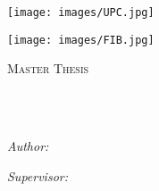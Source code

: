 \documentclass[
11pt, %
english, %
singlespacing, %
headsepline, %
]{MastersDoctoralThesis} %
\author{Pol \textsc{Álvarez Vecino}} %
\begin{document}
\frontmatter %

\pagestyle{plain} %


\begin{titlepage}
\begin{minipage}[c]{0.4\linewidth}
\hspace{0.12\linewidth}%
\texttt{[image: images/UPC.jpg]}
\end{minipage}%
\hspace{0.1\linewidth}%
\begin{minipage}[c]{0.4\linewidth}
\texttt{[image: images/FIB.jpg]}
\end{minipage}
\begin{center}

\vspace*{.06\textheight}
{\scshape\LARGE \univname\par}\vspace{1.5cm} %
\textsc{\Large Master Thesis}\\[0.5cm] %

\HRule \\[0.4cm] %
{\huge \bfseries \ttitle\par}\vspace{0.4cm} %
\HRule \\[1.5cm] %
 
\begin{minipage}[t]{0.4\textwidth}
\begin{flushleft} \large
\emph{Author:}\\{\authorname} %
\end{flushleft}
\end{minipage}
\begin{minipage}[t]{0.4\textwidth}
\begin{flushright} \large
\emph{Supervisor:} \\
{\supname} %
\end{flushright}
\end{minipage}\\[3cm]
 

\end{center}
\end{titlepage}
\end{document}

